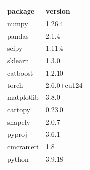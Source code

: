 \begin{tabular}{ll}
\toprule
package & version \\
\midrule
numpy & 1.26.4 \\
pandas & 2.1.4 \\
scipy & 1.11.4 \\
sklearn & 1.3.0 \\
catboost & 1.2.10 \\
torch & 2.6.0+cu124 \\
matplotlib & 3.8.0 \\
cartopy & 0.23.0 \\
shapely & 2.0.7 \\
pyproj & 3.6.1 \\
cmcrameri & 1.8 \\
python & 3.9.18 \\
\bottomrule
\end{tabular}
